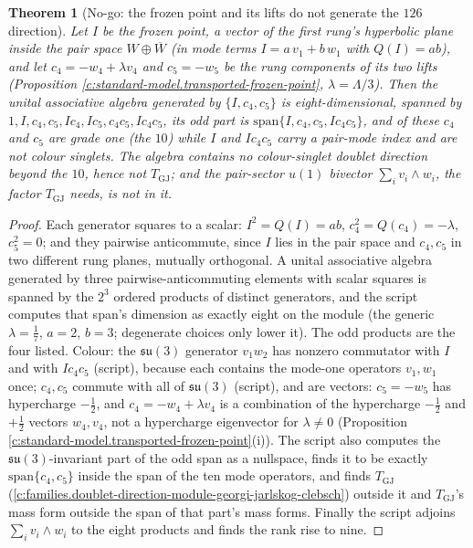 \documentclass[11pt]{article}
\newtheorem{theorem}{Theorem}[section]
\theoremstyle{definition}
\theoremstyle{plain}
\newcommand{\changedmark}[2]{\marginpar{\raggedright\scriptsize\color{#1}#2}}
\providecommand{\su}{}\renewcommand{\su}{\mathfrak{su}}
\begin{document}
\begin{theorem}[No-go: the frozen point and its lifts do not generate the $126$ direction]\label{c:standard-model.no-go-frozen-point-lifts-do}
\changedmark{gray}{reworded}
Let $I$ be the frozen point, a vector of the first rung's hyperbolic plane inside the pair space $W \oplus \overline{W}$ (in mode terms $I = a\,v_{1} + b\,w_{1}$ with $Q(I) = ab$), and let $c_{4} = -w_{4} + \lambda v_{4}$ and $c_{5} = -w_{5}$ be the rung components of its two lifts (Proposition \ref{c:standard-model.transported-frozen-point}, $\lambda = \Lambda/3$). Then the unital associative algebra generated by $\{I, c_{4}, c_{5}\}$ is eight-dimensional, spanned by $1, I, c_{4}, c_{5}, Ic_{4}, Ic_{5}, c_{4}c_{5}, Ic_{4}c_{5}$, its odd part is $\mathrm{span}\{I, c_{4}, c_{5}, Ic_{4}c_{5}\}$, and of these $c_{4}$ and $c_{5}$ are grade one (the $10$) while $I$ and $Ic_{4}c_{5}$ carry a pair-mode index and are not colour singlets. The algebra contains no colour-singlet doublet direction beyond the $10$, hence not $T_{\mathrm{GJ}}$; and the pair-sector $u(1)$ bivector $\sum_{i}v_{i}\wedge w_{i}$, the factor $T_{\mathrm{GJ}}$ needs, is not in it.
\end{theorem}
\begin{proof}
Each generator squares to a scalar: $I^{2} = Q(I) = ab$, $c_{4}^{2} = Q(c_{4}) = -\lambda$, $c_{5}^{2} = 0$; and they pairwise anticommute, since $I$ lies in the pair space and $c_{4}, c_{5}$ in two different rung planes, mutually orthogonal. A unital associative algebra generated by three pairwise-anticommuting elements with scalar squares is spanned by the $2^{3}$ ordered products of distinct generators, and the script computes that span's dimension as exactly eight on the module (the generic $\lambda = \tfrac17$, $a = 2$, $b = 3$; degenerate choices only lower it). The odd products are the four listed. Colour: the $\su(3)$ generator $v_{1}w_{2}$ has nonzero commutator with $I$ and with $Ic_{4}c_{5}$ (script), because each contains the mode-one operators $v_{1}, w_{1}$ once; $c_{4}, c_{5}$ commute with all of $\su(3)$ (script), and are vectors: $c_{5} = -w_{5}$ has hypercharge $-\tfrac12$, and $c_{4} = -w_{4} + \lambda v_{4}$ is a combination of the hypercharge $-\tfrac12$ and $+\tfrac12$ vectors $w_{4}, v_{4}$, not a hypercharge eigenvector for $\lambda \ne 0$ (Proposition \ref{c:standard-model.transported-frozen-point}(i)). The script also computes the $\su(3)$-invariant part of the odd span as a nullspace, finds it to be exactly $\mathrm{span}\{c_{4}, c_{5}\}$ inside the span of the ten mode operators, and finds $T_{\mathrm{GJ}}$ (\ref{c:families.doublet-direction-module-georgi-jarlskog-clebsch}) outside it and $T_{\mathrm{GJ}}$'s mass form outside the span of that part's mass forms. Finally the script adjoins $\sum_{i}v_{i}\wedge w_{i}$ to the eight products and finds the rank rise to nine.

\end{proof}
\end{document}
